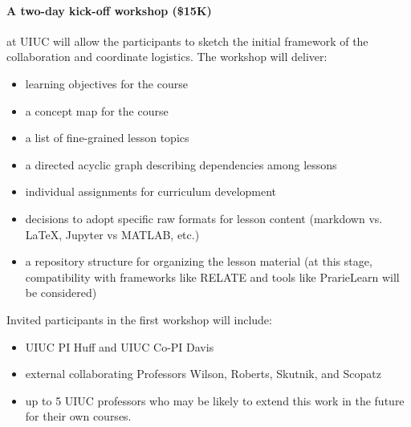 \documentclass[11pt]{article}
\begin{document}
\iffalse
          Doing code review at the end of the work isn't useful. What works is 
          incremental code review. This proposal suspects that the same is true 
          for curriculum review.  \cite{wilson_software_2014}.

          Education is an inherently distributed system, but this need not be a hinderance to collaboration.

          Scientists are more than happy to build upon one another's work, form 
          collaborations with others in their field. But, 
          when it comes to educating, where is the sharing of lessons learned 
          and collaboration? 
\fi

          \paragraph{A two-day kick-off workshop (\$15K)} at UIUC will allow the 
          participants to sketch the initial framework of 
          the collaboration and coordinate logistics. The workshop will 
          deliver:

          \begin{itemize} 
                  \item learning objectives\cite{bloom_bloom_1984} for the 
                          course
                  \item a concept map\cite{novak_concept_1990} for the course
                  \item a list of fine-grained lesson topics
                  \item a directed acyclic graph describing dependencies among 
                          lessons
                  \item individual assignments for curriculum development
                  \item decisions to adopt specific raw formats for lesson content
                        (markdown vs. \LaTeX, Jupyter vs MATLAB, etc.)
                  \item a repository structure for organizing the lesson 
                          material (at this stage, compatibility with 
                          frameworks like RELATE 
                          \cite{kloeckner_relate_2017,kloeckner_relate_2017} 
                          and tools like PrarieLearn 
                          \cite{west_prairielearn:_2015} will be considered)
          \end{itemize} 

          Invited participants in the first workshop will include:
          \begin{itemize}
                  \item UIUC PI Huff and UIUC Co-PI Davis
                  \item external collaborating Professors Wilson, Roberts, 
                          Skutnik, and Scopatz
                  \item up to 5 UIUC professors who may be likely to extend 
                          this work in the future for their own courses.
          \end{itemize}
\end{document}
